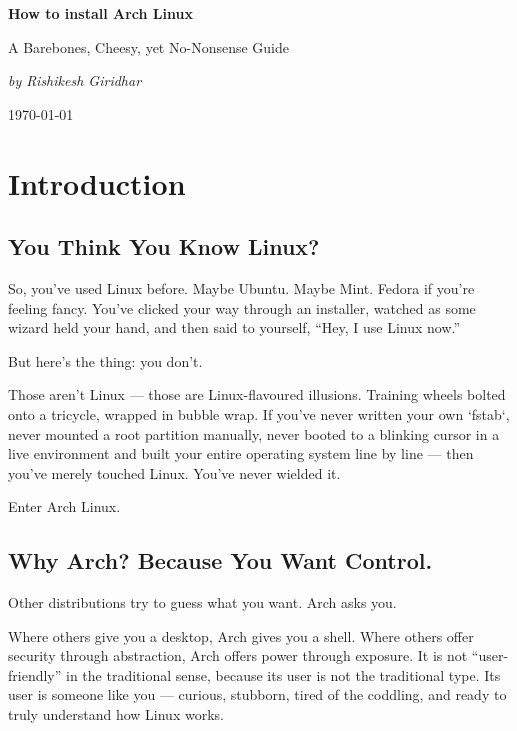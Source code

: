 \documentclass[12pt,openany]{book}
\begin{document}
\begin{titlepage}
    \centering
    \vspace*{4cm}
    {\Huge\bfseries How to install Arch Linux \par}
    \vspace{1cm}
    {\Large A Barebones, Cheesy, yet No-Nonsense Guide \par}
    \vspace{2cm}
    {\Large \textit{by Rishikesh Giridhar} \par}
    \vfill
    {\large \today \par}
\end{titlepage}

\tableofcontents
\newpage

\chapter{Introduction}

\section*{You Think You Know Linux?}

So, you’ve used Linux before. Maybe Ubuntu. Maybe Mint. Fedora if you're feeling fancy. You’ve clicked your way through an installer, watched as some wizard held your hand, and then said to yourself, “Hey, I use Linux now.”

But here's the thing: you don’t.

Those aren’t Linux — those are Linux-flavoured illusions. Training wheels bolted onto a tricycle, wrapped in bubble wrap. If you’ve never written your own `fstab`, never mounted a root partition manually, never booted to a blinking cursor in a live environment and built your entire operating system line by line — then you’ve merely touched Linux. You’ve never wielded it.

Enter Arch Linux.

\section*{Why Arch? Because You Want Control.}

Other distributions try to guess what you want. Arch asks you.

Where others give you a desktop, Arch gives you a shell. Where others offer security through abstraction, Arch offers power through exposure. It is not “user-friendly” in the traditional sense, because its user is not the traditional type. Its user is someone like you — curious, stubborn, tired of the coddling, and ready to truly understand how Linux works.
\end{document}
